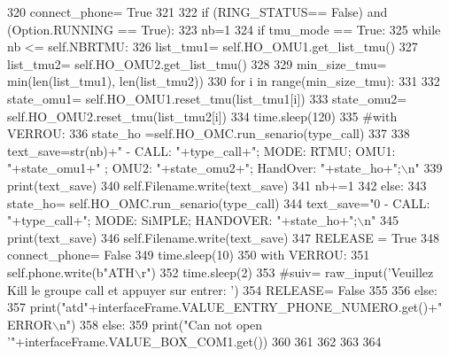 \begin{DoxyCode}
320                 connect\_phone= \textcolor{keyword}{True}
321 
322                 \textcolor{keywordflow}{if} (RING\_STATUS== \textcolor{keyword}{False}) \textcolor{keywordflow}{and} (Option.RUNNING == \textcolor{keyword}{True}):
323                     nb=1
324                     \textcolor{keywordflow}{if} tmu\_mode == \textcolor{keyword}{True}:
325                         \textcolor{keywordflow}{while} nb <= self.NBRTMU:
326                             list\_tmu1= self.HO\_OMU1.get\_list\_tmu()
327                             list\_tmu2= self.HO\_OMU2.get\_list\_tmu()
328 
329                             min\_size\_tmu= min(len(list\_tmu1), len(list\_tmu2))
330                             \textcolor{keywordflow}{for} i \textcolor{keywordflow}{in} range(min\_size\_tmu):
331 
332                                 state\_omu1= self.HO\_OMU1.reset\_tmu(list\_tmu1[i])
333                                 state\_omu2= self.HO\_OMU2.reset\_tmu(list\_tmu2[i])
334                                 time.sleep(120)
335                                 \textcolor{comment}{#with VERROU:
}
336                                 state\_ho =self.HO\_OMC.run\_senario(type\_call)
337                                 
338                                 text\_save=str(nb)+\textcolor{stringliteral}{" - CALL: "}+type\_call+\textcolor{stringliteral}{"; MODE: RTMU; OMU1: "}+state\_omu1+\textcolor{stringliteral}{"
      ; OMU2: "}+state\_omu2+\textcolor{stringliteral}{"; HandOver: "}+state\_ho+\textcolor{stringliteral}{";\(\backslash\)n"}
339                                 print(text\_save)
340                                 self.Filename.write(text\_save)
341                             nb+=1
342                     \textcolor{keywordflow}{else}:
343                         state\_ho= self.HO\_OMC.run\_senario(type\_call)
344                         text\_save=\textcolor{stringliteral}{"0 - CALL: "}+type\_call+\textcolor{stringliteral}{"; MODE: SiMPLE; HANDOVER: "}+state\_ho+\textcolor{stringliteral}{";\(\backslash\)n"}
345                         print(text\_save)
346                         self.Filename.write(text\_save)
347                     RELEASE = \textcolor{keyword}{True}
348                     connect\_phone= \textcolor{keyword}{False}
349                     time.sleep(10)
350                     with VERROU:
351                         self.phone.write(b\textcolor{stringliteral}{"ATH\(\backslash\)r"})
352                     time.sleep(2)
353                     \textcolor{comment}{#suiv= raw\_input('Veuillez Kill le groupe call et appuyer sur entrer: ')
}
354                     RELEASE= \textcolor{keyword}{False}
355 
356             \textcolor{keywordflow}{else}:
357                 print(\textcolor{stringliteral}{"atd"}+interfaceFrame.VALUE\_ENTRY\_PHONE\_NUMERO.get()+\textcolor{stringliteral}{" ERROR\(\backslash\)n"})
358         \textcolor{keywordflow}{else}:
359             print(\textcolor{stringliteral}{"Can not open '"}+interfaceFrame.VALUE\_BOX\_COM1.get())
360 
361 
362 
363 
364 
\end{DoxyCode}
